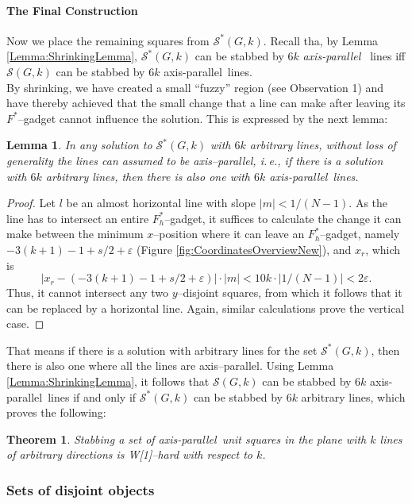 \documentclass[12pt]{article}
\newtheorem{lemma}[definition]{Lemma}
\newtheorem{theorem}[definition]{Theorem}
\newcommand{\eps}{\varepsilon}
\newcommand{\cclass}[1]{{#1}}
\newcommand{\wone}{\cclass{W[1]}}
\newcommand{\ap}{a.p.\ }
\renewcommand{\ap}{axis-parallel\ }
\newcommand{\calS}{\mathcal{S}}
\begin{document}
\paragraph{The Final Construction}
Now we place the remaining squares from $\calS^*(G, k)$. Recall tha, by Lemma \ref{Lemma:ShrinkingLemma}, $\calS^*(G, k)$ can be stabbed by $6k$ \textit{\ap} lines iff $\calS(G, k)$ can be stabbed by $6k$ \ap lines.\\
By shrinking, we have created a small ``fuzzy'' region (see Observation 1) and have thereby achieved that the small change that a line can make after leaving its $F^*$--gadget cannot influence the solution. This is expressed by the next lemma:
\begin{lemma}\label{Lemma:WlogHV} In any solution to $\calS^*(G, k)$ with $6k$ arbitrary lines, without loss of generality the lines can assumed to be axis--parallel, i.\,e., if there is a solution with $6k$ arbitrary lines, then there is also one with $6k$ \ap lines. 
\end{lemma}
\begin{proof} 
Let $l$ be an almost horizontal line with slope $|m| < 1/(N-1)$. As the line has to intersect an entire $F_h^*$--gadget, it suffices to calculate the change it can make between the minimum $x$--position where it can leave an $F_h^*$--gadget, namely $-3(k + 1) - 1 + s/2 + \eps$ (Figure \ref{fig:CoordinatesOverviewNew}), and $x_r$, which is
\[ |x_r - \left(-3(k + 1) - 1 + s/2 + \eps\right) |\cdot |m| < 10k \cdot |1/(N-1)| < 2\eps. \] 
Thus, it cannot intersect any two $y$--disjoint squares, from which it follows that it can be replaced by a horizontal line. Again, similar calculations prove the vertical case.
\end{proof}
That means if there is a solution with arbitrary lines for the set $\calS^*(G, k)$, then there is also one where all the lines are axis--parallel.
Using Lemma \ref{Lemma:ShrinkingLemma}, it follows that $\calS(G, k)$ can be stabbed by $6k$ \ap lines if and only if $\calS^*(G, k)$ can be stabbed by $6k$ arbitrary lines, which proves the following: 
\begin{theorem}\label{thm:wonehardunitsquaresarbitrary} 
Stabbing a set of \ap unit squares in the plane with $k$ lines of arbitrary directions is \wone--hard with respect to $k$.
\end{theorem} 
\subsubsection{Sets of disjoint objects}
\end{document}
